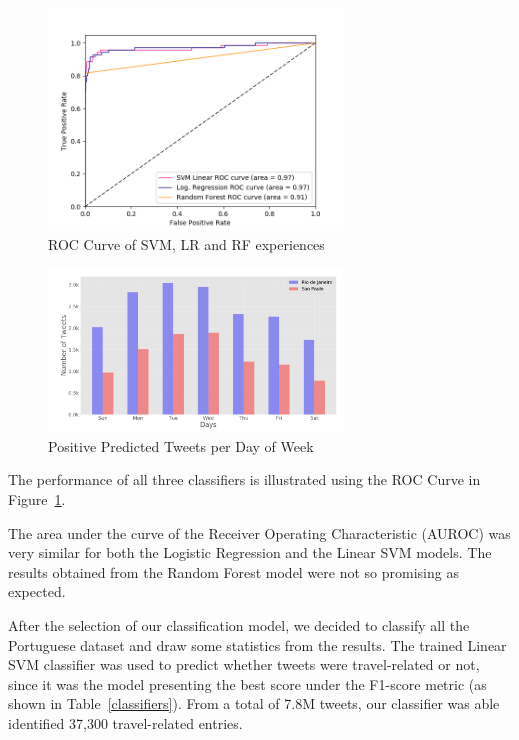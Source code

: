 \begin{figure}[!htp]
	\centering
	\includegraphics[width=0.7\textwidth]{figures/roc_auc_brazilian_travel_related}
	\caption{ROC Curve of SVM, LR and RF experiences}
	\label{fig:roc_curve}
\end{figure}

\begin{figure}[!hbp]
	\centering
	\includegraphics[width=0.7\textwidth]{figures/predicted_day_of_week}
	\caption{Positive Predicted Tweets per Day of Week}
	\label{fig:predicted}
\end{figure}


The performance of all three classifiers is illustrated using the ROC Curve in Figure~\ref{fig:roc_curve}.

The area under the curve of the Receiver Operating Characteristic (AUROC) was very similar for both the Logistic Regression and the Linear SVM models. The results obtained from the Random Forest model were not so promising as expected.

After the selection of our classification model, we decided to classify all the Portuguese dataset and draw some statistics from the results. The trained Linear SVM classifier was used to predict whether tweets were travel-related or not, since it was the model presenting the best score under the F1-score metric (as shown in Table~\ref{classifiers}). From a total of 7.8M tweets, our classifier was able identified 37,300 travel-related entries.


